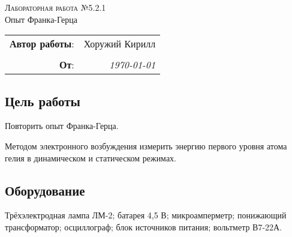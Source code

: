 
\phantom{42}
\vspace{20mm}

\begin{center}
    \LARGE \textsc{Лабораторная работа №5.2.1} \\
    \vspace{3 mm}
    \large Опыт Франка-Герца 
\end{center}


\phantom{42}

\begin{flushright}
    \begin{tabular}{rr}
        \textbf{Автор работы}: 
        & Хоружий Кирилл \\
        & \\
        \textbf{От}: &
        \textit{\today}\\
    \end{tabular}
\end{flushright}

\thispagestyle{empty}

\vspace{10mm}


\subsection*{Цель работы}
\begin{enumerate*}
    \item Повторить опыт Франка-Герца.
    \item Методом электронного возбуждения измерить энергию первого уровня атома гелия в динамическом и статическом режимах.
\end{enumerate*}


\subsection*{Оборудование}
Трёхэлектродная лампа ЛМ-2;
батарея 4,5 В;
микроамперметр;
понижающий трансформатор;
осциллограф;
блок источников питания;
вольтметр В7-22А.


\newpage
